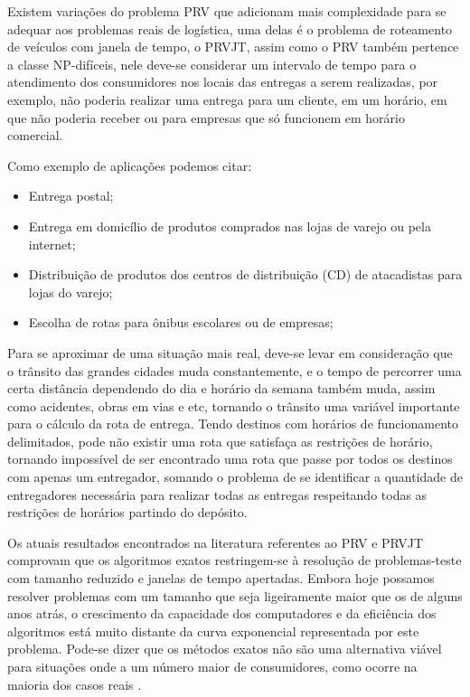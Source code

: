 Existem variações do problema PRV que adicionam mais complexidade para se adequar aos problemas reais de logística, uma delas é o problema de roteamento de veículos com janela de tempo, o PRVJT, assim como o PRV também pertence a classe NP-difíceis, nele deve-se considerar um intervalo de tempo para o atendimento dos consumidores nos locais das entregas a serem realizadas, por exemplo, não poderia realizar uma entrega para um cliente, em um horário, em que não poderia receber ou para empresas que só funcionem em horário comercial. 

Como exemplo de aplicações podemos citar:
\begin{itemize}
	\item Entrega postal;
	\item Entrega em domicílio de produtos comprados nas lojas de varejo ou pela internet;
	\item Distribuição de produtos dos centros de distribuição (CD) de atacadistas para lojas do varejo;
	\item Escolha de rotas para ônibus escolares ou de empresas;
\end{itemize}

Para se aproximar de uma situação mais real, deve-se levar em consideração que o trânsito das grandes cidades muda constantemente, e o tempo de percorrer uma certa distância dependendo do dia e horário da semana também muda, assim como acidentes, obras em vias e etc, tornando o trânsito uma variável importante para o cálculo da rota de entrega. Tendo destinos com horários de funcionamento delimitados, pode não existir uma rota que satisfaça as restrições de horário, tornando impossível de ser encontrado uma rota que passe por todos os destinos com apenas um entregador, somando o problema de se identificar a quantidade de entregadores necessária para realizar todas as entregas respeitando todas as restrições de horários partindo do depósito. 

Os atuais resultados encontrados na literatura referentes ao PRV e PRVJT comprovam que os algoritmos exatos restringem-se à resolução de problemas-teste com tamanho reduzido e janelas de tempo apertadas. Embora hoje possamos resolver problemas com um tamanho que seja ligeiramente maior que os de alguns anos atrás, o crescimento da capacidade dos computadores e da eficiência dos algoritmos está muito distante da curva exponencial representada por este problema. Pode-se dizer que os métodos exatos não são uma alternativa viável para situações onde a um número maior de consumidores, como ocorre na maioria dos casos reais \cite{Chabrier}.

